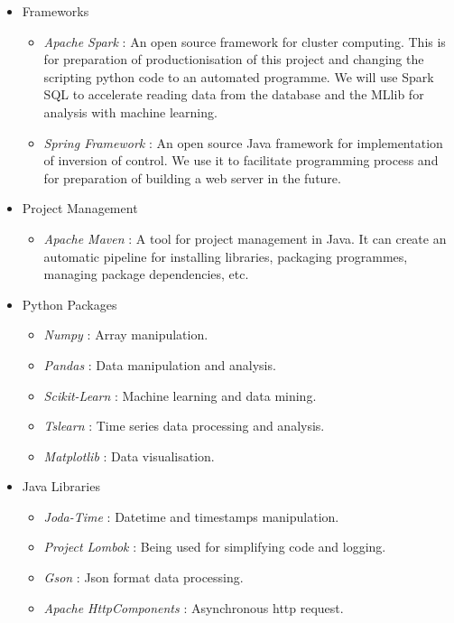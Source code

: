 \documentclass[11pt]{article} %
\theoremstyle{plain}
\theoremstyle{definition}
\begin{document}
\begin{itemize}
  \item Frameworks
  \begin{itemize}
    \item \textsl{Apache Spark}\cite{spark} : An open source framework for cluster computing. This is for preparation of productionisation of this project and changing the scripting python code to an automated programme. We will use Spark SQL to accelerate reading data from the database and the MLlib for analysis with machine learning.
    \item \textsl{Spring Framework}\cite{spring} : An open source Java framework for implementation of inversion of control. We use it to facilitate programming process and for preparation of building a web server in the future.
  \end{itemize}

  \item Project Management
  \begin{itemize}
    \item \textsl{Apache Maven}\cite{maven} : A tool for project management in Java. It can create an automatic pipeline for installing libraries, packaging programmes, managing package dependencies, etc.
  \end{itemize}

  \item Python Packages
  \begin{itemize}
    \item \textsl{Numpy}\cite{scipy} : Array manipulation.
    \item \textsl{Pandas}\cite{scipy} : Data manipulation and analysis.
    \item \textsl{Scikit-Learn}\cite{scipy} : Machine learning and data mining.
    \item \textsl{Tslearn}\cite{tslearn} : Time series data processing and analysis.
    \item \textsl{Matplotlib}\cite{scipy} : Data visualisation.
  \end{itemize}

  \item Java Libraries
  \begin{itemize}
    \item \textsl{Joda-Time}\cite{jodatime} : Datetime and timestamps manipulation.
    \item \textsl{Project Lombok}\cite{lombok} : Being used for simplifying code and logging.
    \item \textsl{Gson}\cite{gson} : Json format data processing.
    \item \textsl{Apache HttpComponents}\cite{httpcomponents} : Asynchronous http request.
  \end{itemize}

\end{itemize}
\end{document}
